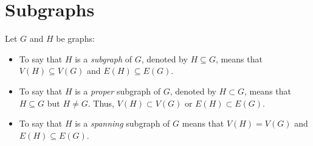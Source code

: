 \documentclass[letterpaper,12pt,fleqn]{article}
\begin{document}
\section*{Subgraphs}

\begin{definition}[Subgraph]
  Let \(G\) and \(H\) be graphs:
  \begin{itemize}
  \item To say that \(H\) is a \emph{subgraph} of \(G\), denoted by \(H\subseteq G\), means that \(V(H)\subseteq
    V(G)\) and \(E(H)\subseteq E(G)\).
  \item To say that \(H\) is a \emph{proper} subgraph of \(G\), denoted by \(H\subset G\), means that \(H\subseteq
    G\) but \(H\ne G\).  Thus, \(V(H)\subset V(G)\) or \(E(H)\subset E(G)\).
  \item To say that \(H\) is a \emph{spanning} subgraph of \(G\) means that \(V(H)=V(G)\) and \(E(H)\subseteq E(G)\).
  \end{itemize}
\end{definition}
\end{document}
